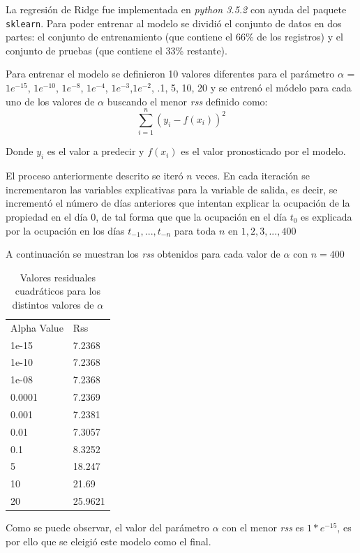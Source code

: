 La regresión de Ridge fue implementada en \emph{python 3.5.2} con ayuda del paquete \texttt{sklearn}. Para poder entrenar al modelo se dividió el conjunto de datos en dos partes: el conjunto de entrenamiento (que contiene el 66\% de los registros) y el conjunto de pruebas (que contiene el 33\% restante). 

Para entrenar el modelo se definieron 10 valores diferentes para el parámetro $\alpha$ = $1e^{-15}$, $1e^{-10}$, $1e^{-8}$, $1e^{-4}$, $1e^{-3}$,$1e^{-2}$, .1, 5, 10, 20 y se entrenó el módelo para cada uno de los valores de $\alpha$ buscando el menor \emph{rss} definido como: $$\sum_{i=1}^{n}(y_i - f(x_i))^2$$

Donde $y_i$ es el valor a predecir y $f(x_i)$ es el valor pronosticado por el modelo.

El proceso anteriormente descrito se iteró $n$ veces. En cada iteración se incrementaron las variables explicativas para la variable de salida, es decir, se incrementó el número de días anteriores que intentan explicar la ocupación de la propiedad en el día 0, de tal forma que que la ocupación en el día $t_0$ es explicada por la ocupación en los días $t_{-1},...,t_{-n}$ para toda $n$ en ${1,2,3,...,400}$

A continuación se muestran los \emph{rss} obtenidos para cada valor de $\alpha$ con $n = 400$

\begin{table}[]
\centering
\begin{tabular}{ll}
Alpha Value & Rss    \\
1e-15       & 7.2368 \\
1e-10       & 7.2368 \\
1e-08       & 7.2368 \\
0.0001      & 7.2369 \\
0.001       & 7.2381 \\
0.01        & 7.3057 \\
0.1         & 8.3252 \\
5           & 18.247 \\
10          & 21.69  \\
20          & 25.9621
\end{tabular}
\caption{Valores residuales cuadráticos para los distintos valores de $\alpha$}
\end{table}

Como se puede observar, el valor del parámetro $\alpha$ con el menor \emph{rss} es $1*e^{-15}$, es por ello que se eleigió este modelo como el final. 

